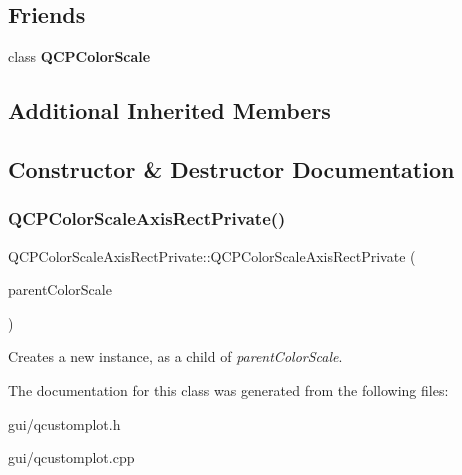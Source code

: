 \subsection*{Friends}
\begin{DoxyCompactItemize}
\item 
\mbox{\label{classQCPColorScaleAxisRectPrivate_a60f6031408a325ebd1bbbad1ccf9b897}} 
class {\bfseries Q\+C\+P\+Color\+Scale}
\end{DoxyCompactItemize}
\subsection*{Additional Inherited Members}


\subsection{Constructor \& Destructor Documentation}
\mbox{\label{classQCPColorScaleAxisRectPrivate_ad3b242f75dd2b33581364a4e668a80db}} 
\subsubsection{\texorpdfstring{Q\+C\+P\+Color\+Scale\+Axis\+Rect\+Private()}{QCPColorScaleAxisRectPrivate()}}
{\footnotesize\ttfamily Q\+C\+P\+Color\+Scale\+Axis\+Rect\+Private\+::\+Q\+C\+P\+Color\+Scale\+Axis\+Rect\+Private (\begin{DoxyParamCaption}\item[{\hyperlink{classQCPColorScale}{Q\+C\+P\+Color\+Scale} $\ast$}]{parent\+Color\+Scale }\end{DoxyParamCaption})\hspace{0.3cm}{\ttfamily [explicit]}}

Creates a new instance, as a child of {\itshape parent\+Color\+Scale}. 

The documentation for this class was generated from the following files\+:\begin{DoxyCompactItemize}
\item 
gui/qcustomplot.\+h\item 
gui/qcustomplot.\+cpp\end{DoxyCompactItemize}
